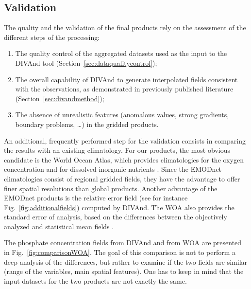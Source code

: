 \documentclass[essd, manuscript]{copernicus}
\begin{document}
\subsection{Validation}

The quality and the validation of the final products rely on the assessment of the different steps of the processing:
\begin{enumerate}
\item The quality control of the aggregated datasets used as the input to the DIVAnd tool (Section~\ref{sec:dataqualitycontrol});
\item The overall capability of DIVAnd to generate interpolated fields consistent with the observations, as demonstrated in previously published literature (Section~\ref{sec:divandmethod});
\item The absence of unrealistic features (anomalous values, strong gradients, boundary problems, \ldots) in the gridded products.
\end{enumerate}

An additional, frequently performed step for the validation consists in comparing the results with an existing climatology. For our products, the most obvious candidate is the World Ocean Atlas, which provides climatologies for the oxygen concentration \citep{Garcia2024} and for dissolved inorganic nutrients \citep{Garcia2024b}. Since the EMODnet climatologies consist of regional gridded fields, they have the advantage to offer finer spatial resolutions than global products. Another advantage of the EMODnet products is the relative error field (see for instance Fig.~\ref{fig:additionalfields}) computed by DIVAnd. The WOA also provides the standard error of analysis, based on the differences between the objectively analyzed and statistical mean fields \citep{Levitus2012}.

The phosphate concentration fields from DIVAnd and from WOA are presented in Fig.~\ref{fig:comparisonWOA}. The goal of this comparison is not to perform a deep analysis of the differences, but rather to examine if the two fields are similar (range of the variables, main spatial features). One has to keep in mind that the input datasets for the two products are not exactly the same. 
\end{document}

